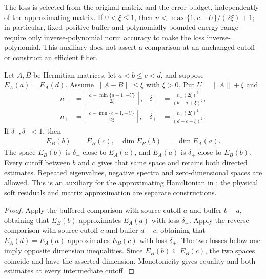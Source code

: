 The loss is selected from the original matrix and the error budget,
independently of the approximating matrix. If $0<\xi\leq1$, then
$n<\max\{1,c+U\}/(2\xi)+1$; in particular, fixed positive buffer and
polynomially bounded energy range require only inverse-polynomial norm
accuracy to make the loss inverse-polynomial. This auxiliary does not
assert a comparison at an unchanged cutoff or construct an efficient
filter.

\begin{lemma}
    \label{lem:spectral_cluster_norm_perturbation}
    \leanok
    Let $A,B$ be Hermitian matrices, let $a<b\le c<d$, and suppose
    $E_A(a)=E_A(d)$. Assume $\|A-B\|\le\xi$ with $\xi>0$.
    Put $U=\|A\|+\xi$ and
    \begin{align}
        n_- & =\left\lceil\frac{a-\min\{a-1,-U\}}{2\xi}\right\rceil,
            & \delta_-                                               & =\frac{n_-(2\xi)^2}{(b-a+\xi)^2}, \\
        n_+ & =\left\lceil\frac{c-\min\{c-1,-U\}}{2\xi}\right\rceil,
            & \delta_+                                               & =\frac{n_+(2\xi)^2}{(d-c+\xi)^2}.
    \end{align}
    If $\delta_-,\delta_+<1$, then
    \begin{align}
        E_B(b) & =E_B(c), & \dim E_B(b) & =\dim E_A(a).
    \end{align}
    The space $E_B(b)$ is $\delta_-$-close to $E_A(a)$, and
    $E_A(a)$ is $\delta_+$-close to $E_B(b)$. Every cutoff between
    $b$ and $c$ gives that same space and retains both directed estimates.
    Repeated eigenvalues, negative spectra and zero-dimensional spaces
    are allowed. This is an auxiliary for the approximating Hamiltonian
    in \cite[lines 1412--1420]{Arad2016RigorousRG}; the physical soft
    residuals and matrix approximation are separate constructions.
\end{lemma}
\begin{proof}\leanok
    Apply the buffered comparison with source cutoff $a$ and buffer
    $b-a$, obtaining that $E_B(b)$ approximates $E_A(a)$ with loss
    $\delta_-$. Apply the reverse comparison with source cutoff $c$
    and buffer $d-c$, obtaining that $E_A(d)=E_A(a)$ approximates
    $E_B(c)$ with loss $\delta_+$. The two losses below one imply
    opposite dimension inequalities. Since $E_B(b)\subseteq E_B(c)$,
    the two spaces coincide and have the asserted dimension. Monotonicity
    gives equality and both estimates at every intermediate cutoff.
\end{proof}


